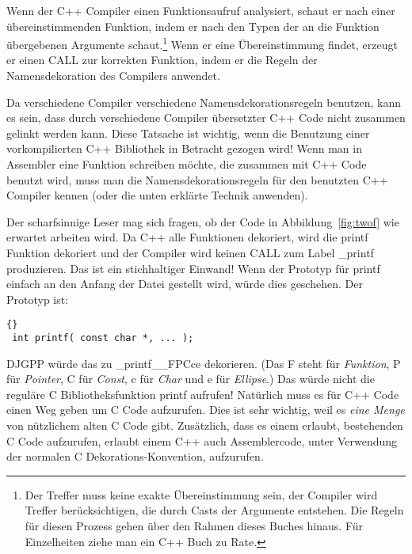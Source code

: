 Wenn der C++ Compiler einen Funktionsaufruf analysiert, schaut er
nach einer \"{u}bereinstimmenden Funktion, indem er nach den Typen der
an die Funktion \"{u}bergebenen Argumente schaut.\footnote{Der Treffer
muss keine exakte \"{U}bereinstimmung sein, der Compiler wird Treffer
ber\"{u}cksichtigen, die durch Casts der Argumente entstehen. Die Regeln
f\"{u}r diesen Prozess gehen \"{u}ber den Rahmen dieses Buches hinaus. F\"{u}r
Einzelheiten ziehe man ein C++ Buch zu Rate.} Wenn er eine
\"{U}bereinstimmung findet, erzeugt er einen {\code CALL} zur korrekten
Funktion, indem er die Regeln der Namensdekoration des Compilers
anwendet.

Da verschiedene Compiler verschiedene Namensdekorationsregeln
benutzen, kann es sein, dass durch verschiedene Compiler \"{u}bersetzter
C++ Code nicht zusammen gelinkt werden kann. Diese Tatsache ist
wichtig, wenn die Benutzung einer vorkompilierten C++ Bibliothek in
Betracht gezogen wird! Wenn man in Assembler eine Funktion schreiben
m\"{o}chte, die zusammen mit C++ Code benutzt wird, muss man die
Namensdekorationsregeln f\"{u}r den benutzten C++ Compiler kennen (oder
die unten erkl\"{a}rte Technik anwenden).

Der scharfsinnige Leser mag sich fragen, ob der Code in
Abbildung~\ref{fig:twof} wie erwartet arbeiten wird. Da C++ alle
Funktionen dekoriert, wird die {\code printf} 
Funktion dekoriert und der Compiler wird keinen {\code CALL} zum
Label {\code \_printf} produzieren. Das ist ein stichhaltiger
Einwand! Wenn der Prototyp f\"{u}r {\code printf} einfach an den Anfang
der Datei gestellt wird, w\"{u}rde dies geschehen. Der Prototyp ist:
\begin{lstlisting}[stepnumber=0]{}
 int printf( const char *, ... );
\end{lstlisting}
\noindent DJGPP w\"{u}rde das zu {\code \_printf\_\_FPCce} dekorieren.
(Das {\code F} steht f\"{u}r \emph{Funktion}, {\code P} f\"{u}r
\emph{Pointer}, {\code C} f\"{u}r \emph{Const}, {\code c} f\"{u}r
\emph{Char} und {\code e} f\"{u}r \emph{Ellipse}.) Das w\"{u}rde nicht die
regul\"{a}re C Bibliotheksfunktion {\code printf} aufrufen! Nat\"{u}rlich
muss es f\"{u}r C++ Code einen Weg geben um C Code aufzurufen. Dies ist
sehr wichtig, weil es \emph{eine Menge} von n\"{u}tzlichem alten C Code
gibt. Zus\"{a}tzlich, dass es einem erlaubt, bestehenden C Code
aufzurufen, erlaubt einem C++ auch Assemblercode, unter Verwendung
der normalen C Dekorations-Konvention, aufzurufen.

